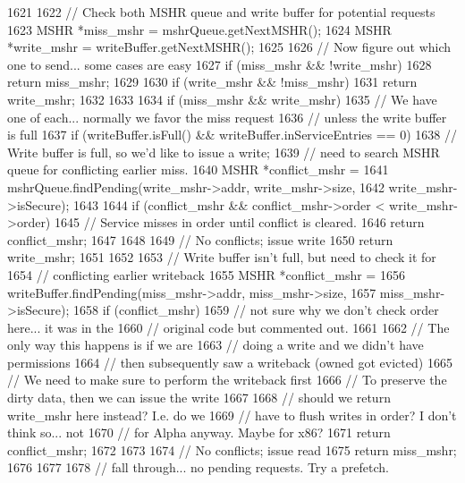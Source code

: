 \begin{DoxyCode}
1621 {
1622     // Check both MSHR queue and write buffer for potential requests
1623     MSHR *miss_mshr  = mshrQueue.getNextMSHR();
1624     MSHR *write_mshr = writeBuffer.getNextMSHR();
1625 
1626     // Now figure out which one to send... some cases are easy
1627     if (miss_mshr && !write_mshr) {
1628         return miss_mshr;
1629     }
1630     if (write_mshr && !miss_mshr) {
1631         return write_mshr;
1632     }
1633 
1634     if (miss_mshr && write_mshr) {
1635         // We have one of each... normally we favor the miss request
1636         // unless the write buffer is full
1637         if (writeBuffer.isFull() && writeBuffer.inServiceEntries == 0) {
1638             // Write buffer is full, so we'd like to issue a write;
1639             // need to search MSHR queue for conflicting earlier miss.
1640             MSHR *conflict_mshr =
1641                 mshrQueue.findPending(write_mshr->addr, write_mshr->size,
1642                                       write_mshr->isSecure);
1643 
1644             if (conflict_mshr && conflict_mshr->order < write_mshr->order) {
1645                 // Service misses in order until conflict is cleared.
1646                 return conflict_mshr;
1647             }
1648 
1649             // No conflicts; issue write
1650             return write_mshr;
1651         }
1652 
1653         // Write buffer isn't full, but need to check it for
1654         // conflicting earlier writeback
1655         MSHR *conflict_mshr =
1656             writeBuffer.findPending(miss_mshr->addr, miss_mshr->size,
1657                                     miss_mshr->isSecure);
1658         if (conflict_mshr) {
1659             // not sure why we don't check order here... it was in the
1660             // original code but commented out.
1661 
1662             // The only way this happens is if we are
1663             // doing a write and we didn't have permissions
1664             // then subsequently saw a writeback (owned got evicted)
1665             // We need to make sure to perform the writeback first
1666             // To preserve the dirty data, then we can issue the write
1667 
1668             // should we return write_mshr here instead?  I.e. do we
1669             // have to flush writes in order?  I don't think so... not
1670             // for Alpha anyway.  Maybe for x86?
1671             return conflict_mshr;
1672         }
1673 
1674         // No conflicts; issue read
1675         return miss_mshr;
1676     }
1677 
1678     // fall through... no pending requests.  Try a prefetch.
}
\end{DoxyCode}
